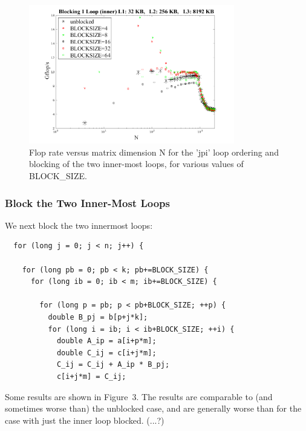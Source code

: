 \documentclass[12pt]{article}
\begin{document}
\begin{figure}[ht]
\vspace*{-0.05in}
\centering
    \includegraphics[width=0.8\textwidth]{Fig_2.png}
  \caption{Flop rate versus matrix dimension N for the 'jpi'
           loop ordering and blocking of the two inner-most loops,
           for various values of BLOCK\_SIZE.}
  \label{fig2}
\end{figure}

\subsubsection*{Block the Two Inner-Most Loops}

We next block the two innermost loops:
\begin{singlespace}
\begin{verbatim}
  for (long j = 0; j < n; j++) {

    for (long pb = 0; pb < k; pb+=BLOCK_SIZE) {
      for (long ib = 0; ib < m; ib+=BLOCK_SIZE) {

        for (long p = pb; p < pb+BLOCK_SIZE; ++p) {
          double B_pj = b[p+j*k];
          for (long i = ib; i < ib+BLOCK_SIZE; ++i) {
            double A_ip = a[i+p*m];
            double C_ij = c[i+j*m];
            C_ij = C_ij + A_ip * B_pj;
            c[i+j*m] = C_ij;
\end{verbatim}
\end{singlespace}
 
Some results are shown in Figure~3. The results are comparable to
(and sometimes worse than) the
unblocked case, and are generally worse than for the case with 
just the inner loop blocked.
(...?)
\end{document}
